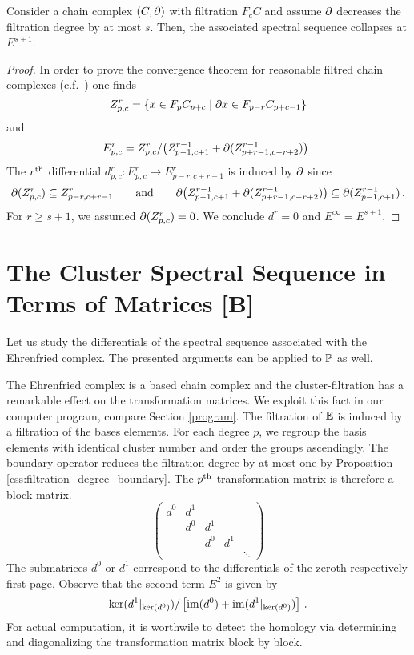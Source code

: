 \begin{lem}
    \label{css:collapsing_ss}
    Consider a chain complex $(C, \del)$ with filtration $F_cC$ and assume $\del$ decreases the filtration degree by at most $s$.
    Then, the associated spectral sequence collapses at $E^{s+1}$.
\end{lem}
\begin{proof}
    In order to prove the convergence theorem for reasonable filtred chain complexes (c.f.\ \cite[Chapter 9, Theorem 2]{Spanier199412}) one finds
    \[
        Z^r_{p,c} = \{ x \in F_pC_{p+c} \mid \del x \in F_{p-r}C_{p+c-1} \}
    \]
    and
    \[
        E^r_{p,c} = Z^r_{p,c} / \big( Z^{r-1}_{p-1,c+1} + \del(Z^{r-1}_{p+r-1,c-r+2})\big) \,.
    \]
    The $r\Th$ differential $d^r_{p,c} \colon E^r_{p,c} \to E^r_{p-r,c+r-1}$ is induced by $\del$ since
    \[
        \del(Z^r_{p,c}) \subseteq Z^r_{p-r,c+r-1} \mspc{and}{20} \del\big( Z^{r-1}_{p-1,c+1} + \del(Z^{r-1}_{p+r-1,c-r+2})\big) \subseteq \del(Z^{r-1}_{p-1,c+1}) \,.
    \]
    For $r \ge s+1$, we assumed $\del(Z^r_{p,c}) = 0$.
    We conclude $d^r = 0$ and $E^\infty = E^{s+1}$.
\end{proof}

\section{The Cluster Spectral Sequence in Terms of Matrices [B]}
\label{css:section_matrix_version}
Let us study the differentials of the spectral sequence associated with the Ehrenfried complex.
The presented arguments can be applied to $\PP$ as well.

The Ehrenfried complex is a based chain complex and the cluster-filtration has a remarkable effect on the transformation matrices.
We exploit this fact in our computer program, compare Section \ref{program}.
The filtration of $\E$ is induced by a filtration of the bases elements.
For each degree $p$, we regroup the basis elements with identical cluster number and order the groups ascendingly.
The boundary operator reduces the filtration degree by at most one by Proposition \ref{css:filtration_degree_boundary}.
The $p\Th$ transformation matrix is therefore a block matrix.
\[ 
    \begin{pmatrix}
        d^0 & d^1 \\
            & d^0   & d^1 \\
            &       & d^0   & d^1 \\
            &       &       &     & \ddots
    \end{pmatrix}
\]    
The submatrices $d^0$ or $d^1$ correspond to the differentials of the zeroth respectively first page.
Observe that the second term $E^2$ is given by
\[
    \ker( d^1|_{\ker(d^0)}) / \left[ \img(d^0) + \img(d^1|_{\ker(d^0)}) \right] \,.
\]
For actual computation, it is worthwile to detect the homology via determining and diagonalizing the transformation matrix block by block.
